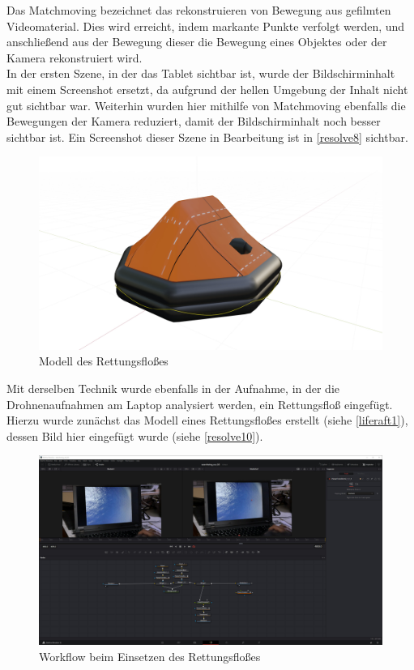 Das Matchmoving bezeichnet das rekonstruieren von Bewegung aus gefilmten Videomaterial. Dies wird erreicht, indem markante Punkte verfolgt werden, und anschließend aus der Bewegung dieser die Bewegung eines Objektes oder der Kamera rekonstruiert wird. \\
In der ersten Szene, in der das Tablet sichtbar ist, wurde der Bildschirminhalt mit einem Screenshot ersetzt, da aufgrund der hellen Umgebung der Inhalt nicht gut sichtbar war. Weiterhin wurden hier mithilfe von Matchmoving ebenfalls die Bewegungen der Kamera reduziert, damit der Bildschirminhalt noch besser sichtbar ist. Ein Screenshot dieser Szene in Bearbeitung ist in \autoref{resolve8} sichtbar.\\

\begin{figure}[H]
\begin{center}
\includegraphics[width=\textwidth]{gfx/prod/boat/liferaft1.jpg}
\caption{Modell des Rettungsfloßes}
\label{liferaft1}
\end{center}
\end{figure}

Mit derselben Technik wurde ebenfalls in der Aufnahme, in der die Drohnenaufnahmen am Laptop analysiert werden, ein Rettungsfloß eingefügt. Hierzu wurde zunächst das Modell eines Rettungsfloßes erstellt (siehe \autoref{liferaft1}), dessen Bild hier eingefügt wurde (siehe \autoref{resolve10}).

\begin{figure}[H]
\begin{center}
\includegraphics[width=\textwidth]{gfx/post/resolve10.jpg}
\caption{Workflow beim Einsetzen des Rettungsfloßes}
\label{resolve10}
\end{center}
\end{figure}

